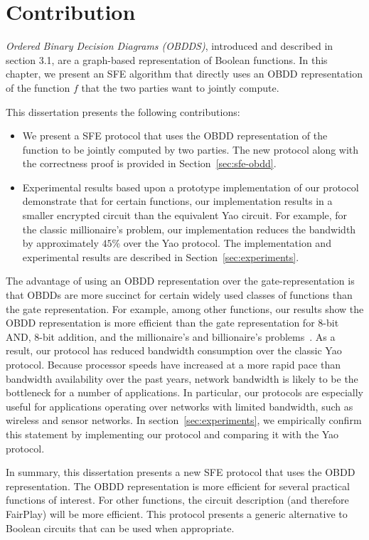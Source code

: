 \section{Contribution}
\label{sec:obdd-intro}



{\it Ordered Binary Decision Diagrams (OBDDS)}, introduced and
described in section 3.1, are a graph-based representation of Boolean
functions.  In this chapter, we present an
SFE algorithm that directly uses an OBDD representation of the
function $f$ that the two parties want to jointly compute. 

This dissertation presents the following contributions:
\begin{itemize}
\item We present a SFE protocol that uses the OBDD representation of
the function to be jointly computed by two parties. The new protocol along with the
correctness proof is provided in Section~\ref{sec:sfe-obdd}.

\item 
Experimental results based upon a prototype implementation of our
protocol demonstrate that for certain functions, our
implementation results in a smaller encrypted circuit than
the equivalent Yao circuit. For example, for the classic millionaire's problem, our
implementation reduces the bandwidth by approximately $45$\% over the Yao
protocol.  The
implementation and experimental results are described in
Section~\ref{sec:experiments}.
\end{itemize}

The
advantage of using an OBDD representation over the gate-representation
is that OBDDs are more succinct for certain widely used classes of
functions than the gate representation. For example, among other
functions, our results show the OBDD representation is more efficient
than the gate representation for 8-bit AND, 8-bit addition, and the
millionaire's and billionaire's problems~\cite{Yao:86}.  As a result,
our protocol has reduced bandwidth consumption over the classic Yao
protocol.  Because processor speeds have
increased at a more rapid pace than bandwidth availability over the
past years, network bandwidth is likely to be the bottleneck for a number of applications. In particular, our
protocols are especially useful for applications operating over
networks with limited bandwidth, such as wireless and sensor networks.
In section~\ref{sec:experiments}, we empirically confirm this statement by
implementing our protocol and comparing it with the Yao protocol.

In summary, this dissertation presents a new SFE protocol that uses the OBDD representation.
The OBDD representation is more efficient for several practical functions of 
interest. For other functions, the circuit description (and therefore
FairPlay) will be more efficient. This protocol presents a generic alternative to 
Boolean circuits that can be used when appropriate. 


